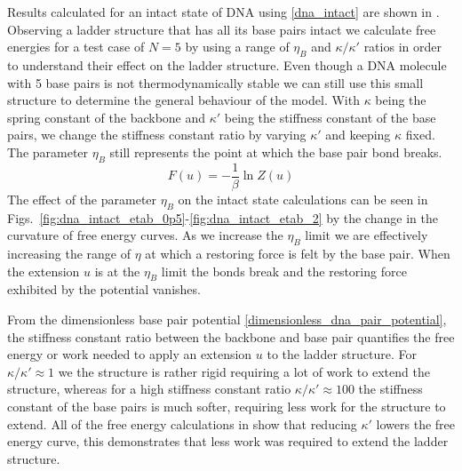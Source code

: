 Results calculated for an intact state of DNA using \eqref{dna_intact} are shown in . Observing a ladder structure that has all its base pairs intact we calculate free energies for a test case of $N=5$ by using a range of $\eta_B$ and $\kappa/\kappa'$ ratios in order to understand their effect on the ladder structure. Even though a DNA molecule with 5 base pairs is not thermodynamically stable we can still use this small structure to determine the general behaviour of the model. With $\kappa$ being the spring constant of the backbone and $\kappa'$ being the stiffness constant of the base pairs, we change the stiffness constant ratio by varying $\kappa'$ and keeping $\kappa$ fixed. The parameter $\eta_B$ still represents the point at which the base pair bond breaks. 
%
\begin{equation}
\label{fig:free_energy}
F\left(u\right)=-\frac{1}{\beta} \ln Z\left(u\right)
\end{equation}
%
The effect of the parameter $\eta_B$ on the intact state calculations can be seen in Figs.~\ref{fig:dna_intact_etab_0p5}-\ref{fig:dna_intact_etab_2} by the change in the curvature of free energy curves. As we increase the $\eta_B$ limit we are effectively increasing the range of $\eta$ at which a restoring force is felt by the base pair. When the extension $u$ is at the $\eta_B$ limit the bonds break and the restoring force exhibited by the potential vanishes. 


From the dimensionless base pair potential \eqref{dimensionless_dna_pair_potential}, the stiffness constant ratio between the backbone and base pair quantifies the free energy or work needed to apply an extension $u$ to the ladder structure. For $\kappa/\kappa'\approx 1$ we the structure is rather rigid requiring a lot of work to extend the structure, whereas for a high stiffness constant ratio $\kappa/\kappa'\approx 100$ the stiffness constant of the base pairs is much softer, requiring less work for the structure to extend. All of the free energy calculations in  show that reducing $\kappa'$ lowers the free energy curve, this demonstrates that less work was required to extend the ladder structure.

